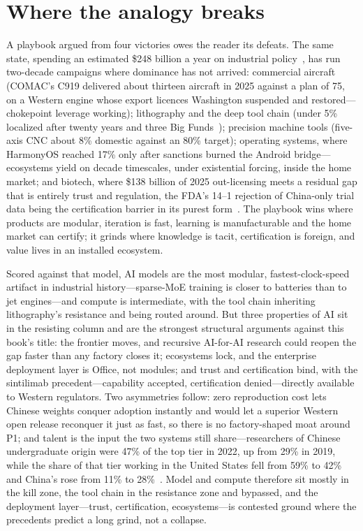 \section{Where the analogy breaks}
\label{c:analogy}

A playbook argued from four victories owes the reader its defeats. The same state, spending an estimated \$248 billion a year on industrial policy~\cite{red-ink}, has run two-decade campaigns where dominance has not arrived: commercial aircraft (COMAC's C919 delivered about thirteen aircraft in 2025 against a plan of 75, on a Western engine whose export licences Washington suspended and restored---chokepoint leverage working); lithography and the deep tool chain (under 5\% localized after twenty years and three Big Funds~\cite{litho-localization,litho}); precision machine tools (five-axis CNC about 8\% domestic against an 80\% target); operating systems, where HarmonyOS reached 17\% only after sanctions burned the Android bridge---ecosystems yield on decade timescales, under existential forcing, inside the home market; and biotech, where \$138 billion of 2025 out-licensing meets a residual gap that is entirely trust and regulation, the FDA's 14--1 rejection of China-only trial data being the certification barrier in its purest form~\cite{biotech}. The playbook wins where products are modular, iteration is fast, learning is manufacturable and the home market can certify; it grinds where knowledge is tacit, certification is foreign, and value lives in an installed ecosystem.

Scored against that model, AI models are the most modular, fastest-clock-speed artifact in industrial history---sparse-MoE training is closer to batteries than to jet engines---and compute is intermediate, with the tool chain inheriting lithography's resistance and being routed around. But three properties of AI sit in the resisting column and are the strongest structural arguments against this book's title: the frontier moves, and recursive AI-for-AI research could reopen the gap faster than any factory closes it; ecosystems lock, and the enterprise deployment layer is Office, not modules; and trust and certification bind, with the sintilimab precedent---capability accepted, certification denied---directly available to Western regulators. Two asymmetries follow: zero reproduction cost lets Chinese weights conquer adoption instantly and would let a superior Western open release reconquer it just as fast, so there is no factory-shaped moat around P1; and talent is the input the two systems still share---researchers of Chinese undergraduate origin were 47\% of the top tier in 2022, up from 29\% in 2019, while the share of that tier working in the United States fell from 59\% to 42\% and China's rose from 11\% to 28\%~\cite{talent}. Model and compute therefore sit mostly in the kill zone, the tool chain in the resistance zone and bypassed, and the deployment layer---trust, certification, ecosystems---is contested ground where the precedents predict a long grind, not a collapse.

